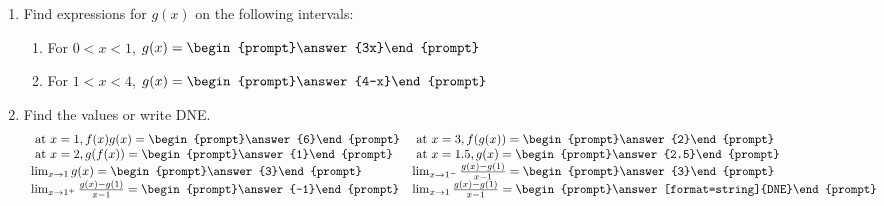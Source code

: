 \documentclass{ximera}
\begin{document}
\begin{exercise}
\begin{enumerate}
\item Find expressions for $g(x)$ on the following intervals:
\begin{enumerate}
\item For $0<x<1$, $g(x)=\begin{prompt}\answer{3x}\end{prompt}$
\item For $1<x<4$, $g(x)=\begin{prompt}\answer{4-x}\end{prompt}$
\end{enumerate}
\item Find the values or write DNE.
\[
\begin{array}{ l l l}
\text{ at } x=1,  f(x)g(x)= \begin{prompt}\answer{6}\end{prompt} &
\text{ at } x=3, f(g(x))= \begin{prompt}\answer{2}\end{prompt} \\
\text{ at } x=2, g(f(x))= \begin{prompt}\answer{1}\end{prompt} &
\text{ at } x=1.5, g(x)= \begin{prompt}\answer{2.5}\end{prompt} \\
\lim_{x\to 1} g(x)=\begin{prompt}\answer{3}\end{prompt} &
\lim_{x\to 1^-} \frac{g(x)-g(1)}{x-1}=\begin{prompt}\answer{3}\end{prompt}\\
\lim_{x\to 1^+} \frac{g(x)-g(1)}{x-1}=\begin{prompt}\answer{-1}\end{prompt} &
\lim_{x\to 1} \frac{g(x)-g(1)}{x-1}=\begin{prompt}\answer[format=string]{DNE}\end{prompt}
\end{array}
\]
\end{enumerate}
\end{exercise}
\end{document}
